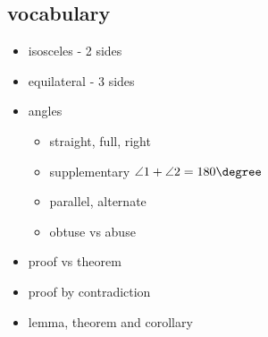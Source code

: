 \subsection{vocabulary}

\begin{itemize}
    \item isosceles - 2 sides
    \item equilateral - 3 sides
    \item angles
        \begin{itemize}
            \item straight, full, right
            \item supplementary \( \angle 1 + \angle 2 = 180 \degree \)
            \item parallel, alternate
            \item obtuse vs abuse
        \end{itemize}
    \item proof vs theorem
    \item proof by contradiction
    \item lemma, theorem and corollary
\end{itemize}
